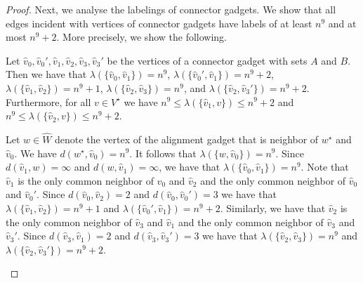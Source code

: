 \documentclass[a4paper,UKenglish,cleveref, autoref, thm-restate, anonymous]{lipics-v2021}
\begin{document}
\begin{proof}
Next, we analyse the labelings of connector gadgets. We show that all edges incident with vertices of connector gadgets have labels of at least $n^9$ and at most $n^9+2$. More precisely, we show the following.
\begin{claim}\label{claim:2}
    Let $\hat{v}_0,\hat{v}_0',\hat{v}_1,\hat{v}_2,\hat{v}_3,\hat{v}_3'$ be the vertices of a connector gadget with sets $A$ and $B$. Then we have that 
        $\lambda(\{\hat{v}_0,\hat{v}_1\})=n^9$,  $\lambda(\{\hat{v}_0',\hat{v}_1\})=n^9+2$,
        $\lambda(\{\hat{v}_1,\hat{v}_2\})=n^9+1$, $\lambda(\{\hat{v}_2,\hat{v}_3\})=n^9$, and $\lambda(\{\hat{v}_2,\hat{v}_3'\})=n^9+2$. 
        Furthermore, for all $v\in V^\star$ we have $n^9\le \lambda(\{\hat{v}_1,v\})\le n^9+2$ and $n^9\le \lambda(\{\hat{v}_2,v\}) \le n^9+2$.
\end{claim}
\begin{claimproof}
    Let $w\in \hat{W}$ denote the vertex of the alignment gadget that is neighbor of $w^\star$ and $\hat{v}_0$. We have $d(w^\star,\hat{v}_0)=n^9$. It follows that $\lambda(\{w,\hat{v}_0\})=n^9$. Since $d(\hat{v}_1,w)=\infty$ and $d(w,\hat{v}_1)=\infty$, we have that $\lambda(\{\hat{v}_0,\hat{v}_1\})=n^9$.
    Note that $\hat{v}_1$ is the only common neighbor of $\hat{v}_0$ and $\hat{v}_2$ and the only common neighbor of $\hat{v}_0$ and $\hat{v}_0'$. Since $d(\hat{v}_0,\hat{v}_2)=2$ and $d(\hat{v}_0,\hat{v}_0')=3$ we have that $\lambda(\{\hat{v}_1,\hat{v}_2\})=n^9+1$ and $\lambda(\{\hat{v}_0',\hat{v}_1\})=n^9+2$. Similarly, we have that $\hat{v}_2$ is the only common neighbor of $\hat{v}_3$ and $\hat{v}_1$ and the only common neighbor of $\hat{v}_3$ and $\hat{v}_3'$. Since $d(\hat{v}_3,\hat{v}_1)=2$ and $d(\hat{v}_3,\hat{v}_3')=3$ we have that $\lambda(\{\hat{v}_2,\hat{v}_3\})=n^9$ and $\lambda(\{\hat{v}_2,\hat{v}_3'\})=n^9+2$.


\end{claimproof}
\end{proof}
\end{document}
